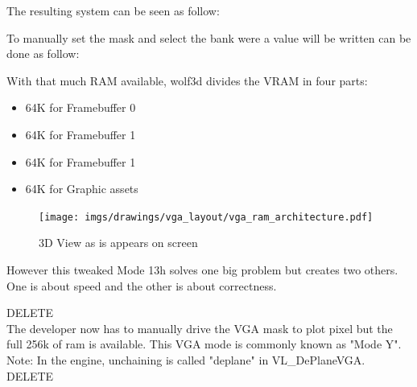 \documentclass[book.tex]{subfiles}
\begin{document}
 \par
  \begin{minipage}{\textwidth}

\end{minipage}
 \par

The resulting system can be seen as follow:\\

 \par
 \begin{minipage}{\textwidth}

\end{minipage}
 \par
 To manually set the mask and select the bank were a value will be written can be done as follow:\\
 \par
 \begin{minipage}{\textwidth}

\end{minipage}
 \par
 With that much RAM available, wolf3d divides the VRAM in four parts:
 \begin{itemize}\label{SetupPages}
 \item 64K for Framebuffer 0
 \item 64K for Framebuffer 1
 \item 64K for Framebuffer 1
 \item 64K for Graphic assets
\end{itemize}
\par
\begin{figure}[H]
\centering
 \texttt{[image: imgs/drawings/vga\_layout/vga\_ram\_architecture.pdf]}
 \caption{3D View as is appears on screen} \label{fig:vga_layout_in_3D}
 \end{figure}
\par
However this tweaked Mode 13h solves one big problem but creates two others. One is about speed and the other is about correctness.\\
\par





DELETE\\
The developer now has to manually drive the VGA mask to plot pixel but the full 256k of ram is available. This VGA mode is commonly known as "Mode Y". Note: In the engine, unchaining is called "deplane" in VL\_DePlaneVGA.\\
DELETE\\
\end{document}
